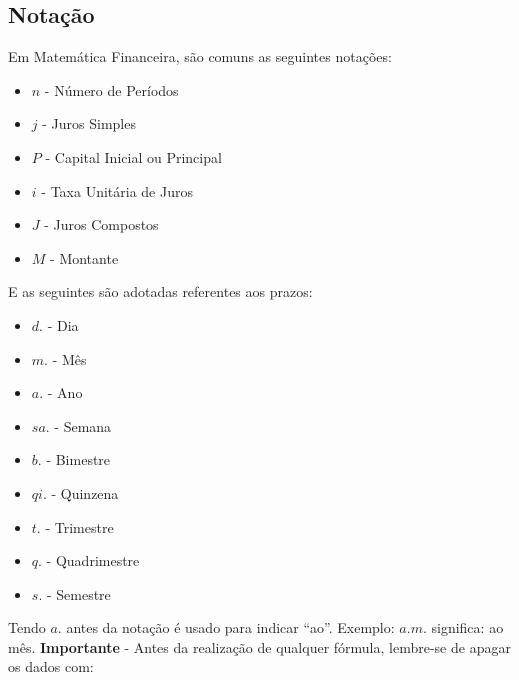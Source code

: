 \subsection*{Notação}
Em Matemática Financeira, são comuns as seguintes notações: \vspace{-1em}
\begin{itemize}
	\item $n$ - Número de Períodos  
	\item $j$ - Juros Simples
	\item $P$ - Capital Inicial ou Principal
	\item $i$ - Taxa Unitária de Juros
	\item $J$ - Juros Compostos
	\item $M$ - Montante
\end{itemize}

E as seguintes são adotadas referentes aos prazos: \vspace{-1em}
\begin{itemize}
	\item $d.$ - Dia
	\item $m.$ - Mês
	\item $a.$ - Ano
	\item $sa.$ - Semana
	\item $b.$ - Bimestre
	\item $qi.$ - Quinzena
	\item $t.$ - Trimestre
	\item $q.$ - Quadrimestre
	\item $s.$ - Semestre
\end{itemize}

Tendo $a.$ antes da notação é usado para indicar “ao”. Exemplo: $a.m.$ significa: ao mês. \textbf{Importante} - Antes da realização de qualquer fórmula, lembre-se de apagar os dados com:
  

